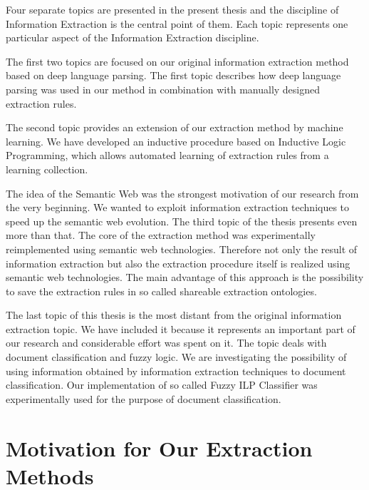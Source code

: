 
\graphicspath{{../img/ch10/}}


Four separate topics are presented in the present thesis and the discipline of Information Extraction is the central point of them. Each topic represents one particular aspect of the Information Extraction discipline.

The first two topics are focused on our original information extraction method based on deep language parsing. The first topic describes how deep language parsing was used in our method in combination with manually designed extraction rules.

The second topic provides an extension of our extraction method by machine learning. We have developed an inductive procedure based on Inductive Logic Programming, which allows automated learning of extraction rules from a learning collection.

The idea of the Semantic Web was the strongest motivation of our research from the very beginning. We wanted to exploit information extraction techniques to speed up the semantic web evolution. The third topic of the thesis presents even more than that. The core of the extraction method was experimentally reimplemented using semantic web technologies. Therefore not only the result of information extraction but also the extraction procedure itself is realized using semantic web technologies. The main advantage of this approach is the possibility to save the extraction rules in so called shareable extraction ontologies.

The last topic of this thesis is the most distant from the original information extraction topic. We have included it because it represents an important part of our research and considerable effort was spent on it. The topic deals with document classification and fuzzy logic. We are investigating the possibility of using information obtained by information extraction techniques to document classification. Our implementation of so called Fuzzy ILP Classifier was experimentally used for the purpose of document classification.

\section{Motivation for Our Extraction Methods}

